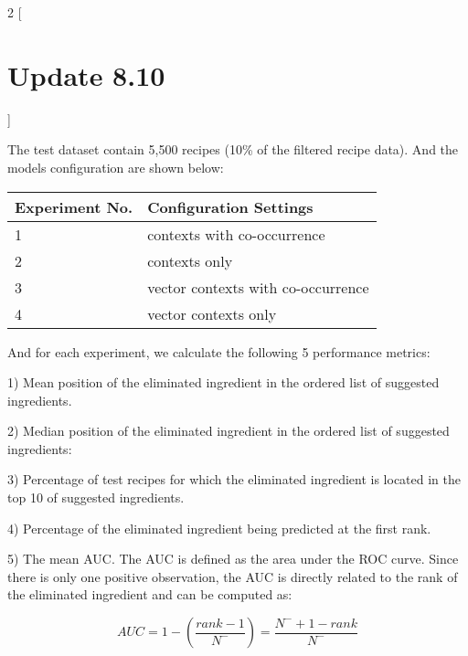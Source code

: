 \documentclass[12pt]{report}
\begin{document}
\iffalse
\begin{titlepage}
   \vspace*{\stretch{1.0}}
   \begin{center}
      \Large\textbf{Weekly Report}\\
      \large\textit{Lingzhen Chen}
   \end{center}
   \vspace*{\stretch{2.0}}
\end{titlepage}
\fi

\begin{multicols}{2}
[\section*{Update 8.10}
]

The test dataset contain 5,500 recipes (10\% of the filtered recipe data). And the models configuration are shown below:

\begin{center}
\begin{tabular}{|l|l|}
\hline
Experiment No. & Configuration Settings \\ \hline
1 & contexts with co-occurrence  \\ \hline
2 & contexts only      \\ \hline
3 & vector contexts with co-occurrence     \\ \hline
4 & vector contexts only      \\ \hline
\end{tabular}
\end{center}

And for each experiment, we calculate the following 5 performance metrics:

1) Mean position of the eliminated ingredient in the ordered list of suggested ingredients.

2) Median position of the eliminated ingredient in the ordered list of suggested ingredients:

3) Percentage of test recipes for which the eliminated ingredient is located in the top 10 of suggested ingredients.

4) Percentage of the eliminated ingredient being predicted at the first rank.

5) The mean AUC. The AUC is defined as the area under the ROC curve. Since there is only one positive observation, the AUC is directly related to the rank of the eliminated ingredient and can be computed as:


\begin{equation}
AUC = 1-(\frac{rank-1}{N^-}) = \frac{N^-+1-rank}{N^-}
\end{equation}


\end{multicols}
\end{document}
